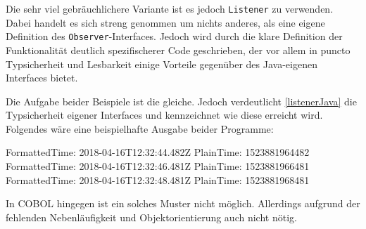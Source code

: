 
Die sehr viel gebräuchlichere Variante ist es jedoch \texttt{Listener} zu verwenden. Dabei handelt es sich streng genommen um nichts anderes, als eine eigene Definition des \texttt{Observer}-Interfaces. Jedoch wird durch die klare Definition der Funktionalität deutlich spezifischerer Code geschrieben, der vor allem in puncto Typsicherheit und Lesbarkeit einige Vorteile gegenüber des Java-eigenen Interfaces bietet.


Die Aufgabe beider Beispiele ist die gleiche. Jedoch verdeutlicht \autoref{listenerJava} die Typsicherheit eigener Interfaces und kennzeichnet wie diese erreicht wird. Folgendes wäre eine beispielhafte Ausgabe beider Programme:

\begin{shellwindow}
FormattedTime: 2018-04-16T12:32:44.482Z
PlainTime: 1523881964482
FormattedTime: 2018-04-16T12:32:46.481Z
PlainTime: 1523881966481
FormattedTime: 2018-04-16T12:32:48.481Z
PlainTime: 1523881968481
\end{shellwindow}

In COBOL hingegen ist ein solches Muster nicht möglich. Allerdings aufgrund der fehlenden Nebenläufigkeit und Objektorientierung auch nicht nötig.